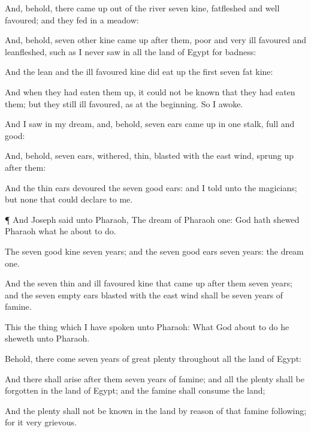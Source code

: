 {And, behold, there came
up out of the
river
seven
kine,
fatfleshed and
well
favoured; and they
fed in a
meadow:

And, behold,
seven
other
kine came
up after
them,
poor and
very
ill
favoured and
leanfleshed,
such as I
never
saw in all the
land of
Egypt for
badness:

And the
lean and the ill
favoured
kine did eat
up the
first
seven
fat
kine:

And when they had eaten them
up, it could not be
known that they had eaten
them; but they
{}
still ill
favoured, as at the
beginning. So I
awoke.

And I
saw in my
dream, and, behold,
seven
ears came
up in
one
stalk,
full and
good:

And, behold,
seven
ears,
withered,
thin,
{}
blasted with the east
wind, sprung
up after
them:

And the
thin
ears
devoured the
seven
good
ears: and I
told
{} unto the
magicians; but
{} none that could
declare
{} to me.


\par }{\PP {}¶ And
Joseph
said unto
Pharaoh, The
dream of
Pharaoh
{}
one:
God hath
shewed
Pharaoh what he
{} about to
do.

The
seven
good
kine
{}
seven
years; and the
seven
good
ears
{}
seven
years: the
dream
{}
one.

And the
seven
thin and ill
favoured
kine that came
up after
them
{}
seven
years; and the
seven
empty
ears
blasted with the east
wind shall be
seven
years of
famine.

This
{} the
thing which I have
spoken unto
Pharaoh: What
God
{} about to
do he
sheweth unto
Pharaoh.

Behold, there
come
seven
years of
great
plenty throughout all the
land of
Egypt:

And there shall
arise after
them
seven
years of
famine; and all the
plenty shall be
forgotten in the
land of
Egypt; and the
famine shall
consume the
land;

And the
plenty shall not be
known in the
land by
reason of that
famine
following; for it
{}
very
grievous.

}

